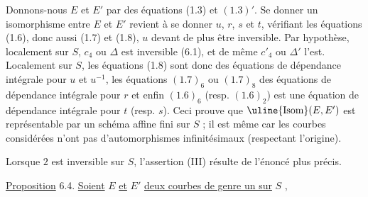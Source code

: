 Donnons-nous $E$ et $E'$ par des équations (1.3) et $(1.3)'$. Se donner un isomorphisme entre $E$ et $E'$ revient à se donner $u$, $r$, $s$ et $t$, vérifiant les équations (1.6), donc aussi (1.7) et (1.8), $u$ devant de plus être inversible. Par hypothèse, localement sur $S$, $c_4$ ou $\Delta$ est inversible (6.1), et de même $c'_4$ ou $\Delta'$ l'est. Localement sur $S$, les équations (1.8) sont donc des équations de dépendance intégrale pour $u$ et $u^{-1}$, les équations $(1.7)_6$ ou $(1.7)_8$ des équations de dépendance intégrale pour $r$ et enfin $(1.6)_6$ (resp. $(1.6)_2$) est une équation de dépendance intégrale pour $t$ (resp. $s$). Ceci prouve que $\text{\uline{Isom}}(E,E')$ est représentable par un schéma affine fini sur $S$ ; il est même  car les courbes considérées n'ont pas d'automorphismes infinitésimaux (respectant l'origine).

Lorsque $2$ est inversible sur $S$, l'assertion (III) résulte de l'énoncé plus précis.

\uline{Proposition} 6.4. \quad \uline{Soient} $E$ \uline{et} $E'$ \uline{deux courbes de genre un sur} $S$ ,%
